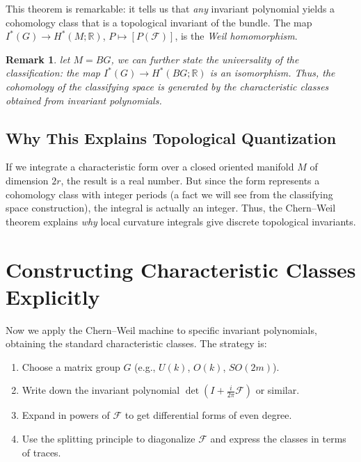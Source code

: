 \documentclass[11pt]{article}
\newcommand{\cF}{\mathcal{F}}
\newcommand{\R}{\mathbb{R}}
\newtheorem{remark}[theorem]{Remark}
\begin{document}
This theorem is remarkable: it tells us that \emph{any} invariant polynomial yields a cohomology class that is a topological invariant of the bundle. The map \(I^*(G) \to H^*(M;\R)\), \(P\mapsto [P(\cF)]\), is the \emph{Weil homomorphism}.

\begin{remark}
    let $M=BG$, we can further state the universality of the classification: the map $I^*(G)\to H^*(BG;\R)$ is an isomorphism. Thus, the cohomology of the classifying space is generated by the characteristic classes obtained from invariant polynomials.
\end{remark}
\subsection{Why This Explains Topological Quantization}
If we integrate a characteristic form over a closed oriented manifold \(M\) of dimension \(2r\), the result is a real number. But since the form represents a cohomology class with integer periods (a fact we will see from the classifying space construction), the integral is actually an integer. Thus, the Chern--Weil theorem explains \emph{why} local curvature integrals give discrete topological invariants.

\section{Constructing Characteristic Classes Explicitly}
\label{sec:explicit-classes}

Now we apply the Chern--Weil machine to specific invariant polynomials, obtaining the standard characteristic classes. The strategy is:
\begin{enumerate}
    \item Choose a matrix group \(G\) (e.g., \(U(k)\), \(O(k)\), \(SO(2m)\)).
    \item Write down the invariant polynomial \(\det(I + \frac{i}{2\pi}\cF)\) or similar.
    \item Expand in powers of \(\cF\) to get differential forms of even degree.
    \item Use the splitting principle to diagonalize \(\cF\) and express the classes in terms of traces.
\end{enumerate}
\end{document}
